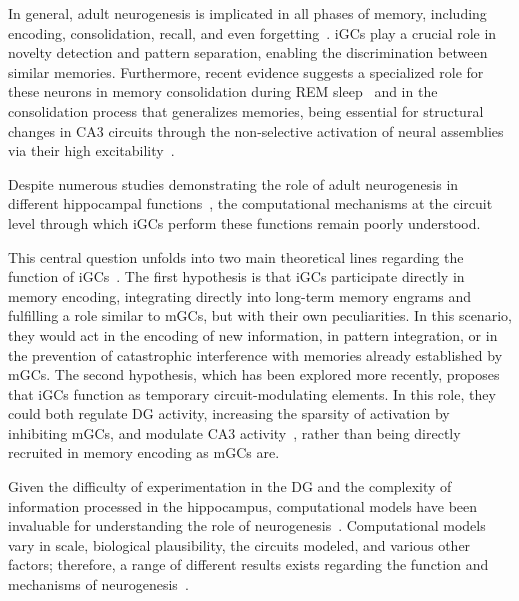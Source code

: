 In general, adult neurogenesis is implicated in all phases of memory, including encoding, consolidation, recall, and even
forgetting~\parencite{chavanMemory2025}\@. iGCs play a crucial role in novelty detection and pattern separation, enabling the
discrimination between similar memories. Furthermore, recent evidence suggests a specialized role for these neurons in memory
consolidation during REM sleep~\parencite{chavanMemory2025} and in the consolidation process that generalizes memories, being
essential for structural changes in CA3 circuits through the non-selective activation of neural assemblies via their high
excitability~\parencite{koSystems2025}.

Despite numerous studies demonstrating the role of adult neurogenesis in different hippocampal
functions~\parencite{chavanMemory2025, berdugo-vegaSharpening2023}, the computational mechanisms at the circuit level through which
iGCs perform these functions remain poorly understood.

This central question unfolds into two main theoretical lines regarding the function of
iGCs~\parencite{berdugo-vegaSharpening2023}. The first hypothesis is that iGCs participate directly in memory encoding, integrating
directly into long-term memory engrams and fulfilling a role similar to mGCs, but with their own peculiarities. In this
scenario, they would act in the encoding of new information, in pattern integration, or in the prevention of catastrophic
interference with memories already established by mGCs. The second hypothesis, which has been explored more recently, proposes
that iGCs function as temporary circuit-modulating elements. In this role, they could both regulate DG activity, increasing the
sparsity of activation by inhibiting mGCs, and modulate CA3 activity~\parencite{aimoneComputational2016,
berdugo-vegaSharpening2023}, rather than being directly recruited in memory encoding as mGCs are.

Given the difficulty of experimentation in the DG and the complexity of information processed in the hippocampus, computational
models have been invaluable for understanding the role of neurogenesis~\parencite{aimoneComputational2016}. Computational models vary
in scale, biological plausibility, the circuits modeled, and various other factors; therefore, a range of different results
exists regarding the function and mechanisms of neurogenesis~\parencite{aimoneComputational2016, berdugo-vegaSharpening2023}.

